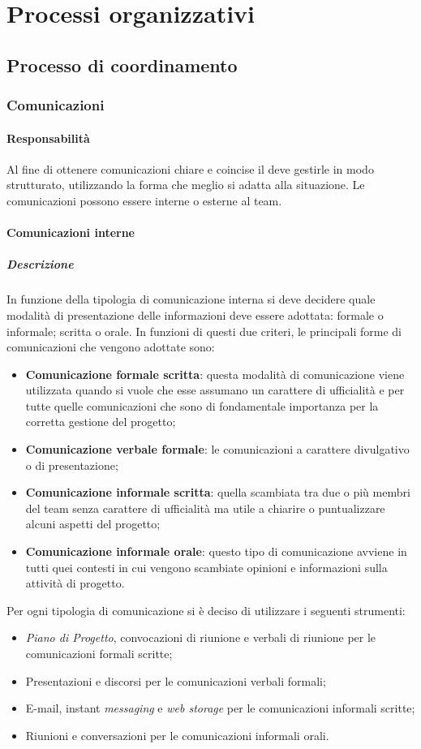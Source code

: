 
\section{Processi organizzativi}

\subsection{Processo di coordinamento}
\subsubsection{Comunicazioni}
\paragraph{Responsabilità}
Al fine di ottenere comunicazioni chiare e coincise il \textit{\RdP} deve gestirle in modo strutturato, utilizzando la forma che meglio si adatta alla situazione.
Le comunicazioni possono essere interne o esterne al team.
\paragraph{Comunicazioni interne}
\subparagraph{Descrizione}
In funzione della tipologia di comunicazione interna si deve decidere quale modalità di presentazione delle informazioni deve essere adottata: formale o informale; scritta o orale.
In funzioni di questi due criteri, le principali forme di comunicazioni che vengono adottate sono:
\begin{itemize}
\item
\textbf{Comunicazione formale scritta}: questa modalità di comunicazione viene utilizzata quando si 
vuole che esse assumano un carattere di ufficialità e per tutte quelle comunicazioni che sono di fondamentale importanza per la corretta gestione del progetto;
\item
\textbf{Comunicazione verbale formale}: le comunicazioni a carattere divulgativo o di presentazione;
\item
\textbf{Comunicazione informale scritta}: quella scambiata tra due o più membri del team senza carattere di ufficialità ma utile a chiarire o puntualizzare alcuni aspetti del progetto;
\item
\textbf{Comunicazione informale orale}: questo tipo di comunicazione avviene in tutti quei contesti in cui vengono scambiate opinioni e informazioni sulla attività di progetto.
\end{itemize}

Per ogni tipologia di comunicazione si è deciso di utilizzare i seguenti strumenti:
\begin{itemize}
\item
\textit{Piano di Progetto}, convocazioni di riunione e verbali di riunione per le comunicazioni formali scritte;
\item
Presentazioni e discorsi per le comunicazioni verbali formali; 
\item
E-mail, instant \textit{messaging} e \textit{web storage} per le comunicazioni informali scritte;
\item
Riunioni e conversazioni per le comunicazioni informali orali.
\end{itemize}

